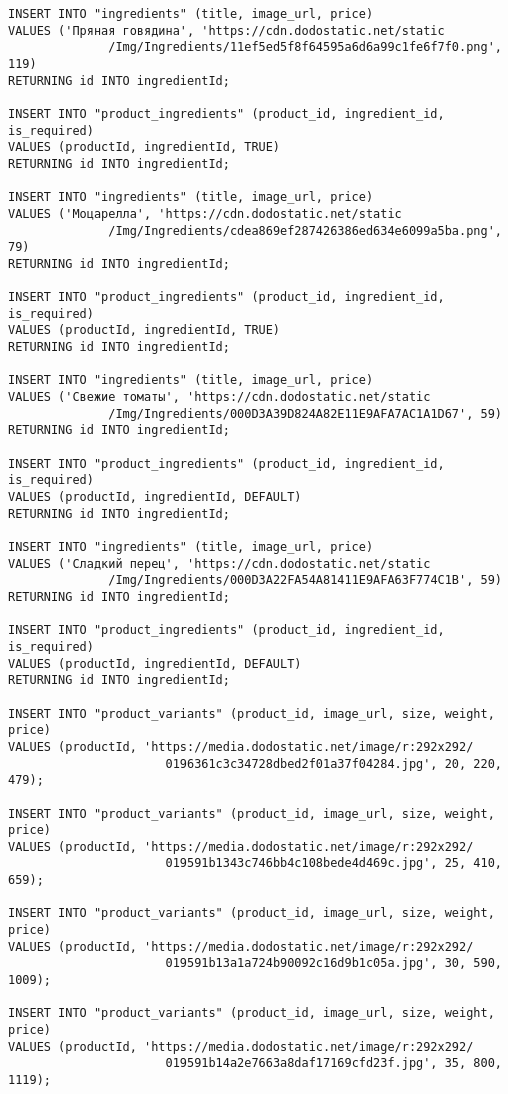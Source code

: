 \documentclass[a4paper,14pt]{extarticle}
\begin{document}
\begin{Verbatim}[tabsize=4,fontsize=\small]
INSERT INTO "ingredients" (title, image_url, price)
VALUES ('Пряная говядина', 'https://cdn.dodostatic.net/static
              /Img/Ingredients/11ef5ed5f8f64595a6d6a99c1fe6f7f0.png', 119)
RETURNING id INTO ingredientId;

INSERT INTO "product_ingredients" (product_id, ingredient_id, is_required)
VALUES (productId, ingredientId, TRUE)
RETURNING id INTO ingredientId;

INSERT INTO "ingredients" (title, image_url, price)
VALUES ('Моцарелла', 'https://cdn.dodostatic.net/static
              /Img/Ingredients/cdea869ef287426386ed634e6099a5ba.png', 79)
RETURNING id INTO ingredientId;

INSERT INTO "product_ingredients" (product_id, ingredient_id, is_required)
VALUES (productId, ingredientId, TRUE)
RETURNING id INTO ingredientId;

INSERT INTO "ingredients" (title, image_url, price)
VALUES ('Свежие томаты', 'https://cdn.dodostatic.net/static
              /Img/Ingredients/000D3A39D824A82E11E9AFA7AC1A1D67', 59)
RETURNING id INTO ingredientId;

INSERT INTO "product_ingredients" (product_id, ingredient_id, is_required)
VALUES (productId, ingredientId, DEFAULT)
RETURNING id INTO ingredientId;

INSERT INTO "ingredients" (title, image_url, price)
VALUES ('Сладкий перец', 'https://cdn.dodostatic.net/static
              /Img/Ingredients/000D3A22FA54A81411E9AFA63F774C1B', 59)
RETURNING id INTO ingredientId;

INSERT INTO "product_ingredients" (product_id, ingredient_id, is_required)
VALUES (productId, ingredientId, DEFAULT)
RETURNING id INTO ingredientId;

INSERT INTO "product_variants" (product_id, image_url, size, weight, price)
VALUES (productId, 'https://media.dodostatic.net/image/r:292x292/
                      0196361c3c34728dbed2f01a37f04284.jpg', 20, 220, 479);

INSERT INTO "product_variants" (product_id, image_url, size, weight, price)
VALUES (productId, 'https://media.dodostatic.net/image/r:292x292/
                      019591b1343c746bb4c108bede4d469c.jpg', 25, 410, 659);

INSERT INTO "product_variants" (product_id, image_url, size, weight, price)
VALUES (productId, 'https://media.dodostatic.net/image/r:292x292/
                      019591b13a1a724b90092c16d9b1c05a.jpg', 30, 590, 1009);

INSERT INTO "product_variants" (product_id, image_url, size, weight, price)
VALUES (productId, 'https://media.dodostatic.net/image/r:292x292/
                      019591b14a2e7663a8daf17169cfd23f.jpg', 35, 800, 1119);


\end{Verbatim}
\end{document}
